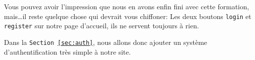\begin{figure}[!h]
    \begin{subfigure}[c]{0.42\textwidth}
        \caption{\label{fig:messages_create}}
    \end{subfigure}
    \hspace{0.2cm}
    \begin{subfigure}[c]{0.52\textwidth}
        \caption{\label{fig:messages_error}}
    \end{subfigure}
    \caption{}
\end{figure}

Vous pouvez avoir l'impression que nous en avons enfin fini avec cette formation, mais\ldots il reste quelque chose qui devrait vous chiffoner: Les deux boutons \verb|login| et \verb|register| sur notre page d'accueil, ils ne servent toujours à rien. 

Dans la \texttt{Section~\ref{sec:auth}}, nous allons donc ajouter un système d'authentification très simple à notre site.
